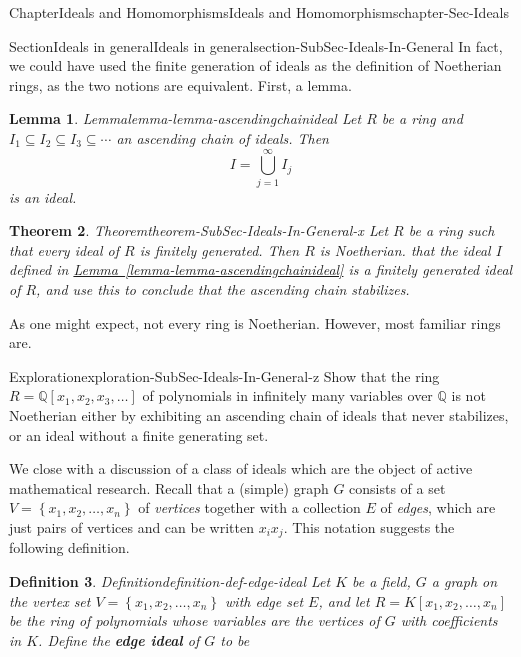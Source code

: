\documentclass[oneside,10pt,]{book}
\newcommand{\xreffont}{\relax}
\newcommand{\terminology}[1]{\textbf{#1}}
\numberwithin{equation}{section}
\newcommand{\set}[1]{\left\{ {#1} \right\}}
\def\Q{{\mathbb Q}}
\newtheorem{theorem}{Theorem}[section]
\newtheorem{lemma}[theorem]{Lemma}
\newtheorem{definition}[theorem]{Definition}
\begin{document}
\begin{chapterptx}{Chapter}{Ideals and Homomorphisms}{}{Ideals and Homomorphisms}{}{}{chapter-Sec-Ideals}
\begin{sectionptx}{Section}{Ideals in general}{}{Ideals in general}{}{}{section-SubSec-Ideals-In-General}
\footnotetext[1]{Recall \hyperref[definition-def-noetherian]{Definition~{\xreffont\ref{definition-def-noetherian}}}.\label{fn-SubSec-Ideals-In-General-u-a-a-c}}%
In fact, we could have used the finite generation of ideals as the definition of Noetherian rings, as the two notions are equivalent. First, a lemma.%
\begin{lemma}{Lemma}{}{}{lemma-lemma-ascendingchainideal}%
Let \(R\) be a ring and \(I_1 \subseteq I_2\subseteq I_3\subseteq \cdots \) an ascending chain of ideals. Then%
\begin{equation*}
I = \bigcup\limits_{j=1}^\infty I_j
\end{equation*}
is an ideal.%
\end{lemma}
\begin{theorem}{Theorem}{}{}{theorem-SubSec-Ideals-In-General-x}%
Let \(R\) be a ring such that every ideal of \(R\) is finitely generated. Then \(R\) is Noetherian.%
\noindentArgue that the ideal \(I\) defined in \hyperref[lemma-lemma-ascendingchainideal]{Lemma~{\xreffont\ref{lemma-lemma-ascendingchainideal}}} is a finitely generated ideal of \(R\), and use this to conclude that the ascending chain stabilizes.%
\end{theorem}
As one might expect, not every ring is Noetherian. However, most familiar rings are.%
\begin{exploration}{Exploration}{}{exploration-SubSec-Ideals-In-General-z}%
Show that the ring \(R = \Q[x_1, x_2, x_3, \ldots]\) of polynomials in infinitely many variables over \(\Q\) is not Noetherian either by exhibiting an ascending chain of ideals that never stabilizes, or an ideal without a finite generating set.%
\end{exploration}%
We close with a discussion of a class of ideals which are the object of active mathematical research. Recall that a (simple) graph \(G\) consists of a set \(V = \set{x_1, x_2, \ldots, x_n}\) of \emph{vertices} together with a collection \(E\) of \emph{edges}, which are just pairs of vertices and can be written \(x_i x_j\). This notation suggests the following definition.%
\begin{definition}{Definition}{}{definition-def-edge-ideal}%
Let \(K\) be a field, \(G\) a graph on the vertex set \(V = \set{x_1, x_2, \ldots, x_n}\) with edge set \(E\), and let \(R = K[x_1, x_2, \ldots, x_n]\) be the ring of polynomials whose variables are the vertices of \(G\) with coefficients in \(K\). Define the \terminology{edge ideal} of \(G\) to be%
\begin{equation*}

\end{equation*}
\end{definition}
\end{sectionptx}
\end{chapterptx}
\end{document}
